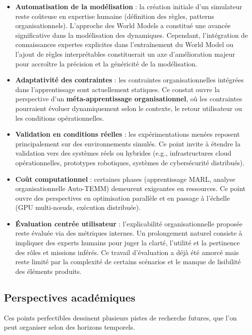 \begin{itemize}
  \item \textbf{Automatisation de la modélisation} : la création initiale d’un simulateur reste coûteuse en expertise humaine (définition des règles, patterns organisationnels). L’approche des World Models a constitué une avancée significative dans la modélisation des dynamiques. Cependant, l’intégration de connaissances expertes explicites dans l’entraînement du World Model ou l’ajout de règles interprétables constituerait un axe d’amélioration majeur pour accroître la précision et la généricité de la modélisation.
  \item \textbf{Adaptativité des contraintes} : les contraintes organisationnelles intégrées dans l’apprentissage sont actuellement statiques. Ce constat ouvre la perspective d’un \textbf{méta-apprentissage organisationnel}, où les contraintes pourraient évoluer dynamiquement selon le contexte, le retour utilisateur ou les conditions opérationnelles.
  \item \textbf{Validation en conditions réelles} : les expérimentations menées reposent principalement sur des environnements simulés. Ce point invite à étendre la validation vers des systèmes réels ou hybrides (e.g., infrastructures cloud opérationnelles, prototypes robotiques, systèmes de cybersécurité distribués).
  \item \textbf{Coût computationnel} : certaines phases (apprentissage MARL, analyse organisationnelle Auto-TEMM) demeurent exigeantes en ressources. Ce point ouvre des perspectives en optimisation parallèle et en passage à l’échelle (GPU multi-nœuds, exécution distribuée).
  \item \textbf{Évaluation centrée utilisateur} : l’explicabilité organisationnelle proposée reste évaluée via des métriques internes. Un prolongement naturel consiste à impliquer des experts humains pour juger la clarté, l’utilité et la pertinence des rôles et missions inférés. Ce travail d’évaluation a déjà été amorcé mais reste limité par la complexité de certains scénarios et le manque de lisibilité des éléments produits.
\end{itemize}

\subsection*{Perspectives académiques}

Ces points perfectibles dessinent plusieurs pistes de recherche futures, que l’on peut organiser selon des horizons temporels.

